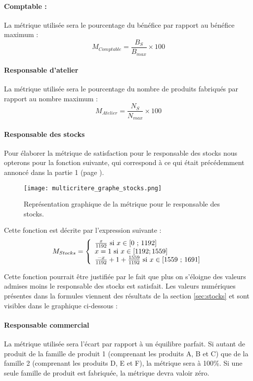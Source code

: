 \paragraph{Comptable :}
La métrique utilisée sera le pourcentage du bénéfice par rapport au bénéfice
maximum :
$$
M_{Comptable} = \frac{B_{S}}{B_{max}} \times 100
$$

\paragraph{Responsable d'atelier}
La métrique utilisée sera le pourcentage du nombre de produits fabriqués par
rapport au nombre maximum :
$$
M_{Atelier} = \frac{N_{S}}{N_{max}} \times 100
$$

\paragraph{Responsable des stocks}
Pour élaborer la métrique de satisfaction pour le responsable des stocks nous
opterons pour la fonction suivante, qui correspond à ce qui était précédemment
annoncé dans la partie 1 (page \pageref{sec:stocks}). 

\begin{figure}[!ht]
\begin{center}
    \texttt{[image: multicritere\_graphe\_stocks.png]}
    \vspace{-1cm}
    \caption{Représentation graphique de la métrique pour le responsable des
	stocks.}
	\end{center}
\end{figure}

Cette fonction est décrite par l'expression suivante :
$$
M_{Stocks} = \left\{ 
    \begin{array}{l l l}
	\frac{x}{1192} \text{ si } x \in \text{[0 ; 1192]} \\
	x=1 \text{ si } x \in [1192 ; 1559]\\
	\frac{-x}{1192}+ 1+\frac{1559}{1192} \text{ si } x \in \text{[1559 ;
	    1691]}\\
    \end{array}
\right.
$$

Cette fonction pourrait être justifiée par le fait que plus on s’éloigne des
valeurs admises moins le responsable des stocks est satisfait. Les valeurs
numériques présentes dans la formules viennent des résultats de la section
\ref{sec:stocks} et sont visibles dans le graphique ci-dessous :


\paragraph{Responsable commercial}
La métrique utilisée sera l'écart par rapport à un équilibre parfait.
Si autant de produit de la famille de produit 1 (comprenant les produits A, B
et C) que de la famille 2 (comprenant les produits D, E et F), la métrique sera
à 100\%.
Si une seule famille de produit est fabriquée, la métrique devra valoir zéro.

